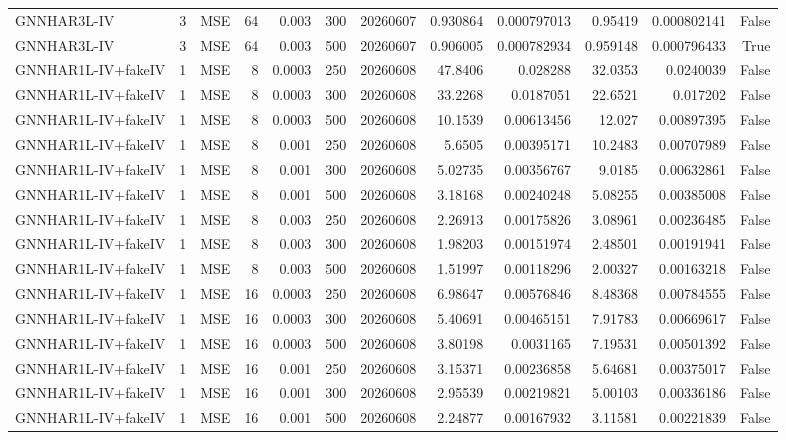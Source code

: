 \begin{tabular}{lrlrrrrrrrrr}
GNNHAR3L-IV & 3 & MSE & 64 & 0.003 & 300 & 20260607 & 0.930864 & 0.000797013 & 0.95419 & 0.000802141 & False \\
GNNHAR3L-IV & 3 & MSE & 64 & 0.003 & 500 & 20260607 & 0.906005 & 0.000782934 & 0.959148 & 0.000796433 & True \\
GNNHAR1L-IV+fakeIV & 1 & MSE & 8 & 0.0003 & 250 & 20260608 & 47.8406 & 0.028288 & 32.0353 & 0.0240039 & False \\
GNNHAR1L-IV+fakeIV & 1 & MSE & 8 & 0.0003 & 300 & 20260608 & 33.2268 & 0.0187051 & 22.6521 & 0.017202 & False \\
GNNHAR1L-IV+fakeIV & 1 & MSE & 8 & 0.0003 & 500 & 20260608 & 10.1539 & 0.00613456 & 12.027 & 0.00897395 & False \\
GNNHAR1L-IV+fakeIV & 1 & MSE & 8 & 0.001 & 250 & 20260608 & 5.6505 & 0.00395171 & 10.2483 & 0.00707989 & False \\
GNNHAR1L-IV+fakeIV & 1 & MSE & 8 & 0.001 & 300 & 20260608 & 5.02735 & 0.00356767 & 9.0185 & 0.00632861 & False \\
GNNHAR1L-IV+fakeIV & 1 & MSE & 8 & 0.001 & 500 & 20260608 & 3.18168 & 0.00240248 & 5.08255 & 0.00385008 & False \\
GNNHAR1L-IV+fakeIV & 1 & MSE & 8 & 0.003 & 250 & 20260608 & 2.26913 & 0.00175826 & 3.08961 & 0.00236485 & False \\
GNNHAR1L-IV+fakeIV & 1 & MSE & 8 & 0.003 & 300 & 20260608 & 1.98203 & 0.00151974 & 2.48501 & 0.00191941 & False \\
GNNHAR1L-IV+fakeIV & 1 & MSE & 8 & 0.003 & 500 & 20260608 & 1.51997 & 0.00118296 & 2.00327 & 0.00163218 & False \\
GNNHAR1L-IV+fakeIV & 1 & MSE & 16 & 0.0003 & 250 & 20260608 & 6.98647 & 0.00576846 & 8.48368 & 0.00784555 & False \\
GNNHAR1L-IV+fakeIV & 1 & MSE & 16 & 0.0003 & 300 & 20260608 & 5.40691 & 0.00465151 & 7.91783 & 0.00669617 & False \\
GNNHAR1L-IV+fakeIV & 1 & MSE & 16 & 0.0003 & 500 & 20260608 & 3.80198 & 0.0031165 & 7.19531 & 0.00501392 & False \\
GNNHAR1L-IV+fakeIV & 1 & MSE & 16 & 0.001 & 250 & 20260608 & 3.15371 & 0.00236858 & 5.64681 & 0.00375017 & False \\
GNNHAR1L-IV+fakeIV & 1 & MSE & 16 & 0.001 & 300 & 20260608 & 2.95539 & 0.00219821 & 5.00103 & 0.00336186 & False \\
GNNHAR1L-IV+fakeIV & 1 & MSE & 16 & 0.001 & 500 & 20260608 & 2.24877 & 0.00167932 & 3.11581 & 0.00221839 & False \\

\end{tabular}
